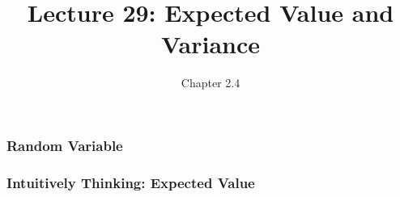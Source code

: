 \documentclass[handout]{beamer}
\title{Lecture 29: Expected Value and Variance}
\author{Chapter 2.4}
\date{}
\newcommand{\blue}[1]{\textcolor{blue2}{#1}}
\begin{document}
\begin{frame}
\titlepage
\end{frame}


\begin{frame}[fragile]
\frametitle{Random Variable}

%
%

\end{frame}


\begin{frame}
\frametitle{Intuitively Thinking: Expected Value}
 
%
% 
%
%
%
%

\end{frame}
\end{document}
